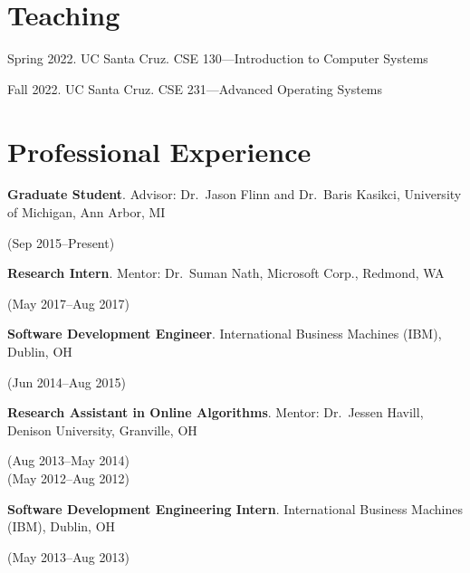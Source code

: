 \documentclass[letterpaper,10pt]{article}
\newcommand{\sidebyside}[2]{
  \begin{minipage}[t]{.75\textwidth}
    \raggedright{}
    #2
  \end{minipage}
  \hspace{.01\textwidth}
    \begin{minipage}[t]{.205\textwidth}
    \raggedleft
    #1
  \end{minipage}
}
\newcommand{\trio}[3]{\sidebyside{#3}{\textbf{#1}. #2}}
\begin{document}

\section{Teaching}
\begin{smenumerate}
  \item Spring 2022. UC Santa Cruz. CSE 130---Introduction to Computer Systems
  \item Fall 2022. UC Santa Cruz. CSE 231---Advanced Operating Systems
  
\end{smenumerate}

\section{Professional Experience}
\begin{smenumerate}
\item\trio{Graduate Student}{Advisor: Dr.\ Jason Flinn and Dr.\ Baris Kasikci,
  University of Michigan, Ann Arbor, MI}{(Sep 2015--Present)}

\item\trio{Research Intern}{Mentor: Dr.\ Suman Nath, Microsoft Corp.,
  Redmond, WA}{(May 2017--Aug 2017)}

\item\trio{Software Development Engineer}{International Business Machines (IBM),
  Dublin, OH}{(Jun 2014--Aug 2015)}

\item\trio{Research Assistant in Online Algorithms}{Mentor: Dr.\ Jessen Havill,
  Denison University, Granville, OH}{(Aug 2013--May 2014)\\(May 2012--Aug 2012)}

\item\trio{Software Development Engineering Intern}{International Business
  Machines (IBM), Dublin, OH}{(May 2013--Aug 2013)}

\end{smenumerate}
\end{document}
